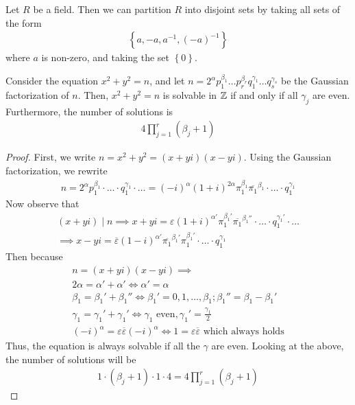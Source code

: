 \documentclass{memoir}
\begin{document}
\begin{prop}
	Let \(R\) be a field. Then we can partition \(R\) into disjoint sets by taking all sets of the form
	\begin{align*}
		\left\{ a, -a, a^{-1}, (-a)^{-1} \right\} 
	\end{align*}
	where \(a\) is non-zero, and taking the set \(\left\{ 0 \right\} \).
\end{prop}
\begin{thm}
Consider the equation \(x^2+y^2 = n\), and let \(n = 2^{\alpha}p_1^{\beta_1}\ldots p_r^{\beta_r}q_1^{\gamma_1}\ldots q_s^{\gamma_s}\) be the Gaussian factorization of \(n\). Then, \(x^2+y^2 = n\) is solvable in \(\mathbb{Z}\) if and only if all \(\gamma_j\) are even. Furthermore, the number of solutions is
\begin{align*}
	4 \prod_{j=1}^{r} (\beta_j + 1) 
\end{align*}
\end{thm}
\begin{proof}
	First, we write \(n = x^2+y^2 = (x+yi)(x-yi)\). Using the Gaussian factorization, we rewrite
	\begin{align*}
		n = 2^{\alpha}p_1^{\beta_1}\cdot \ldots\cdot q_1^{\gamma_1}\cdot \ldots = (-i)^{\alpha}(1+i)^{2\alpha}\pi_1^{\beta_1}\overline{\pi_1}^{\beta_1}\cdot \ldots\cdot q_1^{\gamma_1}
	\end{align*}
	Now observe that
	\begin{align*}
		(x+yi)\mid n \implies x+yi = \varepsilon (1+i)^{\alpha'}\pi_1^{\beta_1'}\overline{\pi_1}^{\beta_1''}\cdot \ldots\cdot q_1^{\gamma_1'}\cdot \ldots \\
		\implies x-yi = \overline{\varepsilon}(1-i)^{\alpha'}\overline{\pi_1}^{\beta_1'}\pi_1^{\beta_1'}\cdot \ldots\cdot q_1^{\gamma_1}
	\end{align*}
	Then because
	\begin{align*}
		n = (x+yi)(x-yi) \implies\\
		2\alpha = \alpha' + \alpha' \iff\alpha' = \alpha\\
		\beta_1 = \beta_1' + \beta_1'' \iff \beta_1' = 0,1,\ldots,\beta_1; \beta_1'' = \beta_1-\beta_1' \\
		\gamma_1 = \gamma_1' + \gamma_1' \iff \gamma_1 \text{ even}, \gamma_1' = \frac{\gamma_1}{2}\\
		(-i)^{\alpha} = \varepsilon \overline{\varepsilon}(-i)^{\alpha} \iff 1 = \varepsilon \overline{\varepsilon} \text{ which always holds}
	\end{align*}
	Thus, the equation is always solvable if all the \(\gamma\) are even. Looking at the above, the number of solutions will be
	\begin{align*}
		1 \cdot (\beta_j+1) \cdot 1 \cdot 4 = 4 \prod_{j=1}^{r} (\beta_j + 1) 
	\end{align*}
\end{proof}
\end{document}
